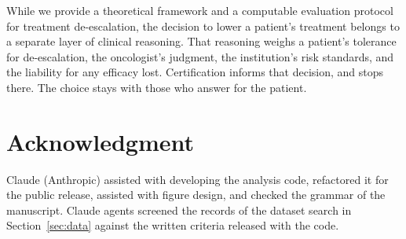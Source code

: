\documentclass[conference]{IEEEtran}
\begin{document}
While we provide a theoretical framework and a computable evaluation protocol for treatment de-escalation, the decision to lower a patient's treatment belongs to a separate layer of clinical reasoning. That reasoning weighs a patient's tolerance for de-escalation, the oncologist's judgment, the institution's risk standards, and the liability for any efficacy lost. Certification informs that decision, and stops there. The choice stays with those who answer for the patient.

\section*{Acknowledgment}

Claude (Anthropic) assisted with developing the analysis code, refactored it for the public release, assisted with figure design, and checked the grammar of the manuscript. Claude agents screened the records of the dataset search in Section~\ref{sec:data} against the written criteria released with the code.



\end{document}
